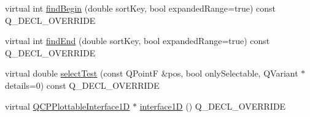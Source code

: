 \begin{DoxyCompactItemize}
\item 
virtual int \hyperlink{classQCPErrorBars_a74c57d6abb8eda3c4c31b72d1df9f568}{find\+Begin} (double sort\+Key, bool expanded\+Range=true) const Q\+\_\+\+D\+E\+C\+L\+\_\+\+O\+V\+E\+R\+R\+I\+DE
\item 
virtual int \hyperlink{classQCPErrorBars_ad22dd8499c6d45176ad0651751a0b0b0}{find\+End} (double sort\+Key, bool expanded\+Range=true) const Q\+\_\+\+D\+E\+C\+L\+\_\+\+O\+V\+E\+R\+R\+I\+DE
\item 
virtual double \hyperlink{classQCPErrorBars_ac1b6675ef43e32547a3cbcf7b7ac46ed}{select\+Test} (const Q\+PointF \&pos, bool only\+Selectable, Q\+Variant $\ast$details=0) const Q\+\_\+\+D\+E\+C\+L\+\_\+\+O\+V\+E\+R\+R\+I\+DE
\item 
virtual \hyperlink{classQCPPlottableInterface1D}{Q\+C\+P\+Plottable\+Interface1D} $\ast$ \hyperlink{classQCPErrorBars_a0b6fbf3a943b4241ee485d066cc8562a}{interface1D} () Q\+\_\+\+D\+E\+C\+L\+\_\+\+O\+V\+E\+R\+R\+I\+DE
\end{DoxyCompactItemize}
